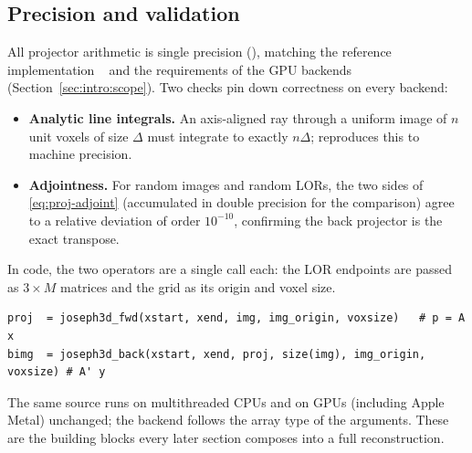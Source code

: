 \subsection{Precision and validation}
\label{sec:projection:validation}

All projector arithmetic is single precision (), matching the
reference implementation ~\cite{schramm2024} and the
requirements of the GPU backends (Section~\ref{sec:intro:scope}). Two checks pin
down correctness on every backend:
\begin{itemize}
  \item \textbf{Analytic line integrals.} An axis-aligned ray through a uniform
        image of $n$ unit voxels of size $\Delta$ must integrate to exactly
        $n\Delta$;  reproduces this to  machine
        precision.
  \item \textbf{Adjointness.} For random images and random LORs, the two sides
        of \eqref{eq:proj-adjoint} (accumulated in double precision for the
        comparison) agree to a relative deviation of order $10^{-10}$,
        confirming the back projector is the exact transpose.
\end{itemize}

In code, the two operators are a single call each: the LOR endpoints are passed
as $3\times M$ matrices and the grid as its origin and voxel size.
\begin{lstlisting}
proj  = joseph3d_fwd(xstart, xend, img, img_origin, voxsize)   # p = A x
bimg  = joseph3d_back(xstart, xend, proj, size(img), img_origin, voxsize) # A' y
\end{lstlisting}
The same source runs on multithreaded CPUs and on GPUs (including Apple Metal)
unchanged; the backend follows the array type of the arguments. These are the
building blocks every later section composes into a full reconstruction.
